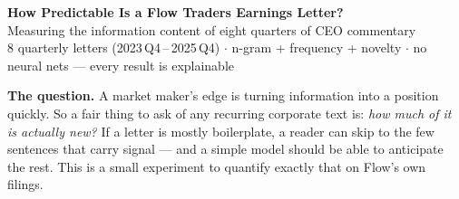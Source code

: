 \documentclass[9pt]{extarticle}
\begin{document}
\begin{center}
    {\LARGE\bfseries How Predictable Is a Flow Traders Earnings Letter?}\\[3pt]
    {\color{warm}\normalsize Measuring the information content of eight quarters of CEO commentary}\\[1pt]
    {\footnotesize 8 quarterly letters (2023\,Q4\,--\,2025\,Q4) $\cdot$ n-gram + frequency + novelty $\cdot$ no neural nets --- every result is explainable}
\end{center}
\vspace{1pt}

\begin{tcolorbox}[colback=softgrey,colframe=accent,boxrule=1pt,arc=2pt,left=7pt,right=7pt,top=3pt,bottom=3pt]
\textbf{The question.} A market maker's edge is turning information into a position quickly. So a fair thing to ask of any recurring corporate text is: \emph{how much of it is actually new?} If a letter is mostly boilerplate, a reader can skip to the few sentences that carry signal --- and a simple model should be able to anticipate the rest. This is a small experiment to quantify exactly that on Flow's own filings.
\end{tcolorbox}
\vspace{2pt}
\end{document}
